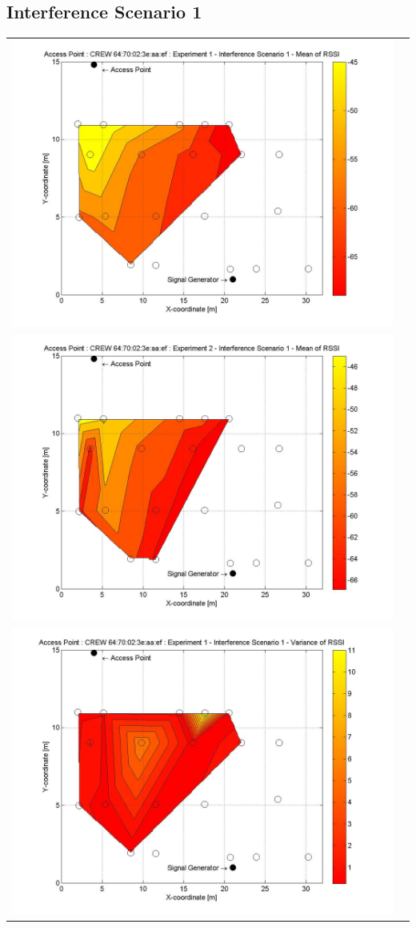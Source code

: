 \documentclass[11pt,a4paper,headinclude,footinclude,chapterprefix=on]{scrreprt}
\begin{document}
\subsection{Interference Scenario 1} 
\begin{longtable}
	{lr} 
	\includegraphics[width=13cm]{../../Source/plot/CREW_ef/ef_Sig_Ex_1_Mean.jpg} \\
	\includegraphics[width=13cm]{../../Source/plot/CREW_ef/ef_Sig_Ex_2_Mean.jpg} \\
	\includegraphics[width=13cm]{../../Source/plot/CREW_ef/ef_Sig_Ex_1_Variance.jpg} \\

\end{longtable}
\end{document}
